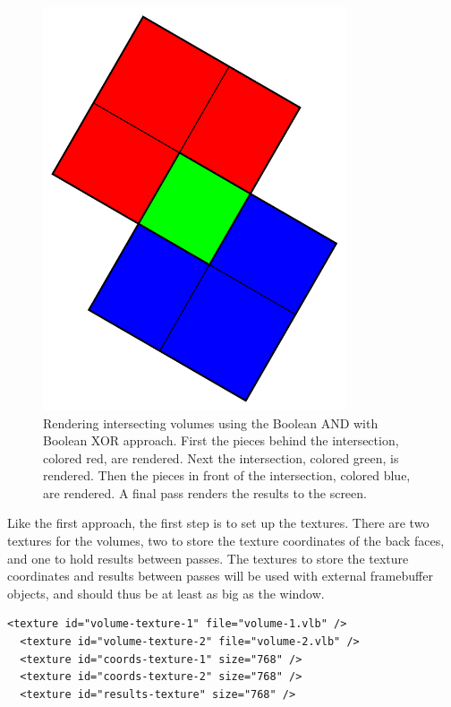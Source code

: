 \documentclass{article}
\begin{document}
\begin{figure}
\centering
\includegraphics[width=0.8\textwidth]{boolean-xor.pdf}
\caption{
Rendering intersecting volumes using the Boolean AND with Boolean XOR approach.
First the pieces behind the intersection, colored red, are rendered.  Next the
intersection, colored green, is rendered.  Then the pieces in front of the
intersection, colored blue, are rendered.  A final pass renders the results to
the screen.
}
\label{boolean-xor}
\end{figure}

Like the first approach, the first step is to set up the textures.  There are
two textures for the volumes, two to store the texture coordinates of the back
faces, and one to hold results between passes.  The textures to store the
texture coordinates and results between passes will be used with external
framebuffer objects, and should thus be at least as big as the window.

\begin{Verbatim}[fontsize=\small]
  <texture id="volume-texture-1" file="volume-1.vlb" />
  <texture id="volume-texture-2" file="volume-2.vlb" />
  <texture id="coords-texture-1" size="768" />
  <texture id="coords-texture-2" size="768" />
  <texture id="results-texture" size="768" />
\end{Verbatim}
\end{document}
